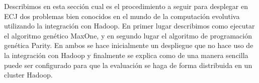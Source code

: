 Describimos en esta sección cual es el procedimiento a seguir para desplegar en ECJ dos problemas bien conocidos en el mundo de la computación evolutiva utilizando la integraci\'on con Hadoop. En primer lugar describimos como ejecutar el algoritmo genético MaxOne, y en segundo lugar el algoritmo de programación genética Parity. En ambos se hace inicialmente un despliegue que no hace uso de la integración con Hadoop y finalmente se explica como de una manera sencilla puede ser configurado para que la evaluación se haga de forma distribuida en un cluster Hadoop.